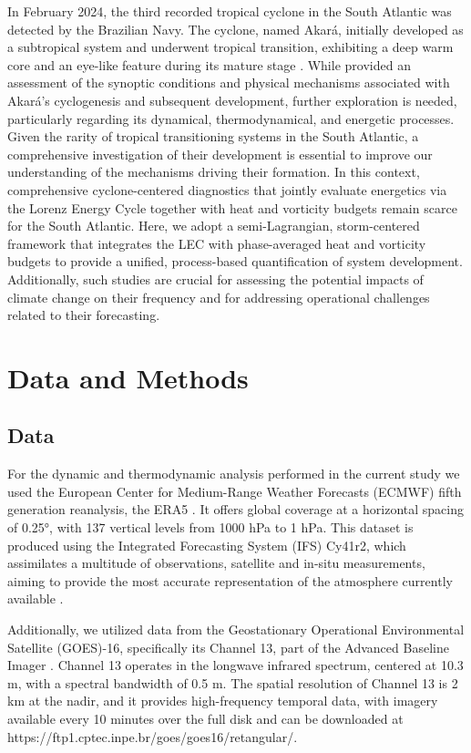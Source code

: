 \documentclass[pdflatex,sn-chicago]{sn-jnl}%
\theoremstyle{plain}
\theoremstyle{definition}
\theoremstyle{remark}
\theoremstyle{definition}
\begin{document}
In February 2024, the third recorded tropical cyclone in the South Atlantic was detected by the Brazilian Navy. The cyclone, named Akará, initially developed as a subtropical system and underwent tropical transition, exhibiting a deep warm core and an eye-like feature during its mature stage \citep{reboita2024assessment}. While \citet{reboita2024assessment} provided an assessment of the synoptic conditions and physical mechanisms associated with Akará's cyclogenesis and subsequent development, further exploration is needed, particularly regarding its dynamical, thermodynamical, and energetic processes. Given the rarity of tropical transitioning systems in the South Atlantic, a comprehensive investigation of their development is essential to improve our understanding of the mechanisms driving their formation. In this context, comprehensive cyclone-centered diagnostics that jointly evaluate energetics via the Lorenz Energy Cycle together with heat and vorticity budgets remain scarce for the South Atlantic. Here, we adopt a semi-Lagrangian, storm-centered framework that integrates the LEC with phase-averaged heat and vorticity budgets to provide a unified, process-based quantification of system development. Additionally, such studies are crucial for assessing the potential impacts of climate change on their frequency and for addressing operational challenges related to their forecasting. 

\section{Data and Methods}

\subsection{Data}

For the dynamic and thermodynamic analysis performed in the current study we used the European Center for Medium-Range Weather Forecasts (ECMWF) fifth generation reanalysis, the ERA5 \citep{hersbach2020era5}. It offers global coverage at a horizontal spacing of 0.25°, with 137 vertical levels from 1000 hPa to 1 hPa. This dataset is produced using the Integrated Forecasting System (IFS) Cy41r2, which assimilates a multitude of observations, satellite and in-situ measurements, aiming to provide the most accurate representation of the atmosphere currently available \citep{hersbach2020era5}.

Additionally, we utilized data from the Geostationary Operational Environmental Satellite (GOES)-16, specifically its Channel 13, part of the Advanced Baseline Imager \citep{schmit2017closer}. Channel 13 operates in the longwave infrared spectrum, centered at 10.3 \textmu m, with a spectral bandwidth of 0.5 \textmu m. The spatial resolution of Channel 13 is 2 km at the nadir, and it provides high-frequency temporal data, with imagery available every 10 minutes over the full disk and can be downloaded at https://ftp1.cptec.inpe.br/goes/goes16/retangular/.
\end{document}

